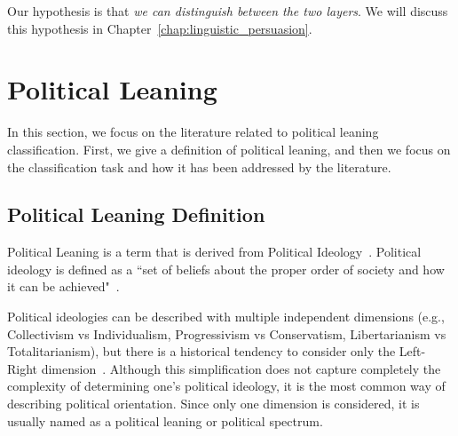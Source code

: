 


Our hypothesis is that \emph{we can distinguish between the two layers}.
We will discuss this hypothesis in Chapter~\ref{chap:linguistic_persuasion}.


\section{\statusgreen Political Leaning}
\label{sec:lit_leaning}

In this section, we focus on the literature related to political leaning classification.
First, we give a definition of political leaning, and then we focus on the classification task and how it has been addressed by the literature.

\subsection{\statusgreen Political Leaning Definition}

Political Leaning is a term that is derived from Political Ideology~\citep{jost2009political}.
Political ideology is defined as a ``set of beliefs about the proper order of society and how it can be achieved"~\citep[p.~64]{erikson2015american}.

Political ideologies can be described with multiple independent dimensions (e.g., %
Collectivism vs Individualism, Progressivism vs Conservatism, Libertarianism vs Totalitarianism), but there is a historical tendency to consider only the Left-Right dimension~\citep{jost2009political}.
Although this simplification does not capture completely the complexity of determining one's political ideology, it is the most common way of describing political orientation.
Since only one dimension is considered, it is usually named as a political leaning or political spectrum.

